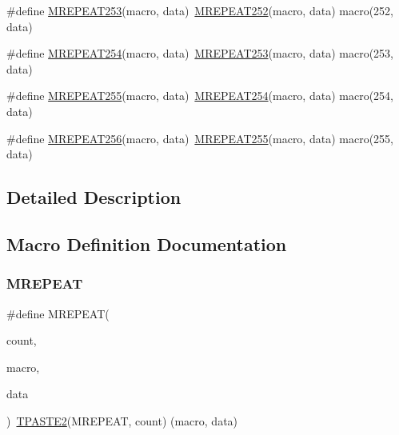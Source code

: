 \begin{DoxyCompactItemize}
\item 
\#define \mbox{\hyperlink{group__group__sam0__utils__mrepeat_gafbbb5e11ca1e4ca9c893de68c868a4cb}{M\+R\+E\+P\+E\+A\+T253}}(macro,  data)~\mbox{\hyperlink{group__group__sam0__utils__mrepeat_ga83ac32e68c09ace0114ad0af4f39b7df}{M\+R\+E\+P\+E\+A\+T252}}(macro, data)   macro(252, data)
\item 
\#define \mbox{\hyperlink{group__group__sam0__utils__mrepeat_gaf3e63914581123ee4c557b0c3b98003b}{M\+R\+E\+P\+E\+A\+T254}}(macro,  data)~\mbox{\hyperlink{group__group__sam0__utils__mrepeat_gafbbb5e11ca1e4ca9c893de68c868a4cb}{M\+R\+E\+P\+E\+A\+T253}}(macro, data)   macro(253, data)
\item 
\#define \mbox{\hyperlink{group__group__sam0__utils__mrepeat_ga9db19e5893568dfa7130030f09a45eba}{M\+R\+E\+P\+E\+A\+T255}}(macro,  data)~\mbox{\hyperlink{group__group__sam0__utils__mrepeat_gaf3e63914581123ee4c557b0c3b98003b}{M\+R\+E\+P\+E\+A\+T254}}(macro, data)   macro(254, data)
\item 
\#define \mbox{\hyperlink{group__group__sam0__utils__mrepeat_gaa49bde8a3b34d9a86caf1c0397d5993f}{M\+R\+E\+P\+E\+A\+T256}}(macro,  data)~\mbox{\hyperlink{group__group__sam0__utils__mrepeat_ga9db19e5893568dfa7130030f09a45eba}{M\+R\+E\+P\+E\+A\+T255}}(macro, data)   macro(255, data)
\end{DoxyCompactItemize}


\subsection{Detailed Description}


\subsection{Macro Definition Documentation}
\mbox{\label{group__group__sam0__utils__mrepeat_ga42db715ccb877ca87d7903f5783bd104}} 
\subsubsection{\texorpdfstring{MREPEAT}{MREPEAT}}
{\footnotesize\ttfamily \#define M\+R\+E\+P\+E\+AT(\begin{DoxyParamCaption}\item[{}]{count,  }\item[{}]{macro,  }\item[{}]{data }\end{DoxyParamCaption})~\mbox{\hyperlink{group__group__sam0__utils__tpaste_ga55fb148844f5ba993a992b609728e82e}{T\+P\+A\+S\+T\+E2}}(M\+R\+E\+P\+E\+AT, count) (macro, data)}



